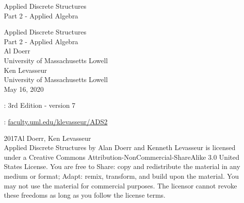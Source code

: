 \documentclass[oneside,10pt,]{book}
\newcommand{\titlepagefont}{\relax}
\numberwithin{equation}{section}
\begin{document}
\frontmatter
\thispagestyle{empty}
{\titlepagefont\centering
\vspace*{0.28\textheight}
{\Huge Applied Discrete Structures}\\[2\baselineskip]
{\LARGE Part 2 - Applied Algebra}\\
}
\clearpage
\thispagestyle{empty}
\null%
\clearpage
\thispagestyle{empty}
{\titlepagefont\centering
\vspace*{0.14\textheight}
{\Huge Applied Discrete Structures}\\[\baselineskip]
{\LARGE Part 2 - Applied Algebra}\\[3\baselineskip]
{\Large Al Doerr}\\[0.5\baselineskip]
{\Large University of Massachusetts Lowell}\\[3\baselineskip]
{\Large Ken Levasseur}\\[0.5\baselineskip]
{\Large University of Massachusetts Lowell}\\[3\baselineskip]
{\Large May 16, 2020}\\}
\clearpage
\thispagestyle{empty}
\hypertarget{g:colophon:idm546610953216}{}
: 3rd Edition - version 7\par\medskip
{}: \href{http:\slash{}\slash{}faculty.uml.edu\slash{}klevasseur\slash{}ADS2}{faculty.uml.edu\slash{}klevasseur\slash{}ADS2}\par\medskip
\noindent\textcopyright{}2017\quad{}Al Doerr, Ken Levasseur\\[0.5\baselineskip]
Applied Discrete Structures by Alan Doerr and Kenneth Levasseur is licensed under a Creative Commons Attribution-NonCommercial-ShareAlike 3.0 United States License. You are free to Share: copy and redistribute the material in any medium or format; Adapt: remix, transform, and build upon the material. You may not use the material for commercial purposes.  The licensor cannot revoke these freedoms as long as you follow the license terms.\par\medskip
{}
\null\clearpage
\cleardoublepage
\end{document}
